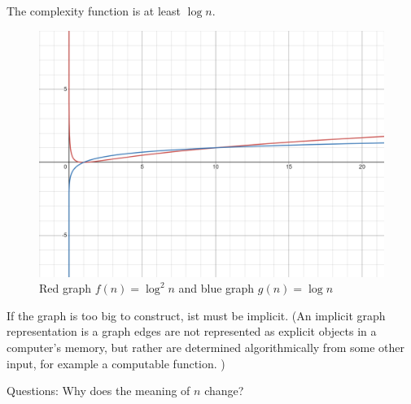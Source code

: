 \documentclass[a4]{scrartcl}
\begin{document}
The complexity function is at least $\log n$.




\begin{figure}[H]
\begin{center}
\includegraphics[scale=0.3]{images/logplot.png}
\caption{Red graph $f(n) = \log ^2 n$ and blue graph $g(n)= \log n$}
\end{center}
\end{figure}

If the graph is too big to construct, ist must be implicit. (An implicit graph representation is a graph edges are not represented as explicit objects in a computer's memory, but rather are determined algorithmically from some other input, for example a computable function. \cite{wiki})


\color{violet} Questions: Why does the meaning of $n$ change?
\color{black}












\newpage

\printbibliography
\end{document}
